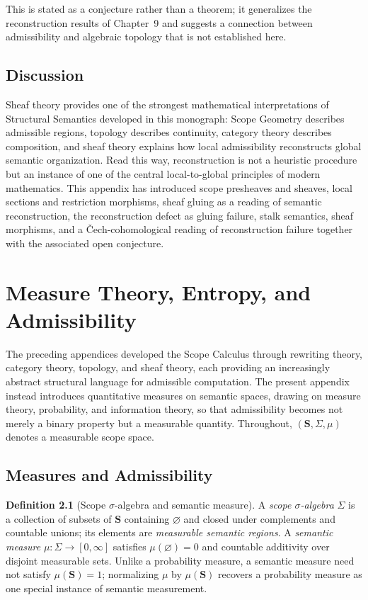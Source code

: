 \documentclass[11pt,twoside,openright]{book}
\numberwithin{equation}{chapter}
\theoremstyle{definition}
\newtheorem{definition}{Definition}[chapter]
\theoremstyle{plain}
\theoremstyle{remark}
\theoremstyle{definition}
\newcommand{\Scope}{\mathbf{S}}
\begin{document}
This is stated as a conjecture rather than a theorem; it generalizes the
reconstruction results of Chapter~9 and suggests a connection between
admissibility and algebraic topology that is not established here.

\section{Discussion}

Sheaf theory provides one of the strongest mathematical interpretations
of Structural Semantics developed in this monograph: Scope Geometry
describes admissible regions, topology describes continuity, category
theory describes composition, and sheaf theory explains how local
admissibility reconstructs global semantic organization. Read this way,
reconstruction is not a heuristic procedure but an instance of one of the
central local-to-global principles of modern mathematics. This appendix
has introduced scope presheaves and sheaves, local sections and
restriction morphisms, sheaf gluing as a reading of semantic
reconstruction, the reconstruction defect as gluing failure, stalk
semantics, sheaf morphisms, and a \v{C}ech-cohomological reading of
reconstruction failure together with the associated open conjecture.

\chapter{Measure Theory, Entropy, and Admissibility}
\label{app:measure}

The preceding appendices developed the Scope Calculus through rewriting
theory, category theory, topology, and sheaf theory, each providing an
increasingly abstract structural language for admissible computation.
The present appendix instead introduces quantitative measures on
semantic spaces, drawing on measure theory, probability, and information
theory, so that admissibility becomes not merely a binary property but a
measurable quantity. Throughout, $(\Scope,\Sigma,\mu)$ denotes a
measurable scope space.

\section{Measures and Admissibility}

\begin{definition}[Scope $\sigma$-algebra and semantic measure]
A \emph{scope $\sigma$-algebra} $\Sigma$ is a collection of subsets of
$\Scope$ containing $\varnothing$ and closed under complements and
countable unions; its elements are \emph{measurable semantic regions}. A
\emph{semantic measure} $\mu:\Sigma\to[0,\infty]$ satisfies
$\mu(\varnothing)=0$ and countable additivity over disjoint measurable
sets. Unlike a probability measure, a semantic measure need not satisfy
$\mu(\Scope)=1$; normalizing $\mu$ by $\mu(\Scope)$ recovers a probability
measure as one special instance of semantic measurement.
\end{definition}
\end{document}
